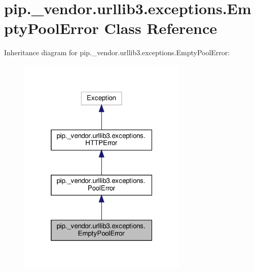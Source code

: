 \hypertarget{classpip_1_1__vendor_1_1urllib3_1_1exceptions_1_1EmptyPoolError}{}\section{pip.\+\_\+vendor.\+urllib3.\+exceptions.\+Empty\+Pool\+Error Class Reference}
\label{classpip_1_1__vendor_1_1urllib3_1_1exceptions_1_1EmptyPoolError}


Inheritance diagram for pip.\+\_\+vendor.\+urllib3.\+exceptions.\+Empty\+Pool\+Error\+:
\nopagebreak
\begin{figure}[H]
\begin{center}
\leavevmode
\includegraphics[width=229pt]{classpip_1_1__vendor_1_1urllib3_1_1exceptions_1_1EmptyPoolError__inherit__graph}
\end{center}
\end{figure}


